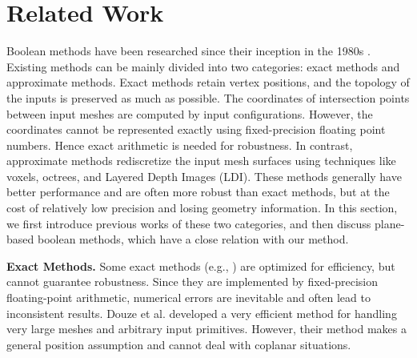 \section{Related Work}

Boolean methods have been researched since their inception in the 1980s \cite{requicha1985boolean, laidlaw1986constructive}. Existing methods can be mainly divided into two categories: exact methods and approximate methods. Exact methods retain vertex positions, and the topology of the inputs is preserved as much as possible. The coordinates of intersection points between input meshes are computed by input configurations. However, the coordinates cannot be represented exactly using fixed-precision floating point numbers. Hence exact arithmetic is needed for robustness. In contrast, approximate methods rediscretize the input mesh surfaces using techniques like voxels, octrees, and Layered Depth Images (LDI). These methods generally have better performance and are often more robust than exact methods, but at the cost of relatively low precision and losing geometry information. 
In this section, we first introduce previous works of these two categories, and then discuss plane-based boolean methods, which have a close relation with our method.

\textbf{Exact Methods.}
Some exact methods (e.g., \cite{ogayar2015deferred,douze2015quickcsg,xu2013fast,feito2013fast,updegrove2016boolean}) are optimized for efficiency, but cannot guarantee robustness. Since they are implemented by fixed-precision floating-point arithmetic, numerical errors are inevitable and often lead to inconsistent results.
Douze et al. \cite{douze2015quickcsg} developed a very efficient method for handling very large meshes and arbitrary input primitives. However, their method makes a general position assumption and cannot deal with coplanar situations.

